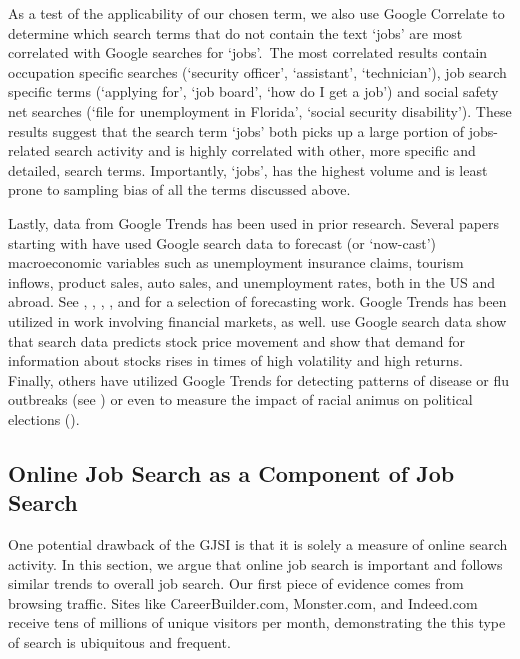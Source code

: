 \documentclass[12pt]{article}
\begin{document}
\begin{spacing}{2}
As a test of the applicability of our chosen term, we also use Google Correlate to determine which search terms that do not contain the text `jobs' are most correlated with Google searches for `jobs'.\footnotemark \ The most correlated results contain occupation specific searches (`security officer', `assistant', `technician'), job search specific terms (`applying for', `job board', `how do I get a job') and social safety net searches (`file for unemployment in Florida', `social security disability'). These results suggest that the search term `jobs' both picks up a large portion of jobs-related search activity and is highly correlated with other, more specific and detailed, search terms. Importantly, `jobs', has the highest volume and is least prone to sampling bias of all the terms discussed above.

Lastly, data from Google Trends has been used in prior research. Several papers starting with \citet{Choi2009} have used Google search data to forecast (or `now-cast') macroeconomic variables such as unemployment insurance claims, tourism inflows, product sales, auto sales, and unemployment rates, both in the US and abroad. See \citet{DAmuri2009}, \citet{Choi2013}, \citet{Fondeur2011}, \citet{Askitas2010}, and \citet{Artola2012} for a selection of forecasting work. Google Trends has been utilized in work involving financial markets, as well. \citet{DaZhiEngelberg2011} use Google search data show that search data predicts stock price movement and \citet{Vlastakis2012} show that demand for information about stocks rises in times of high volatility and high returns. Finally, others have utilized Google Trends for detecting patterns of disease or flu outbreaks (see \citet{Preis2014}) or even to measure the impact of racial animus on political elections (\citet{Stephens-Davidowitz2013}).


\subsection{Online Job Search as a Component of Job Search}\label{sec:impjobsearch}
One potential drawback of the GJSI is that it is solely a measure of online search activity. In this section, we argue that online job search is important and follows similar trends to overall job search. Our first piece of evidence comes from browsing traffic. Sites like CareerBuilder.com, Monster.com, and Indeed.com receive tens of millions of unique visitors per month, demonstrating the this type of search is ubiquitous and frequent.


\end{spacing}
\end{document}
